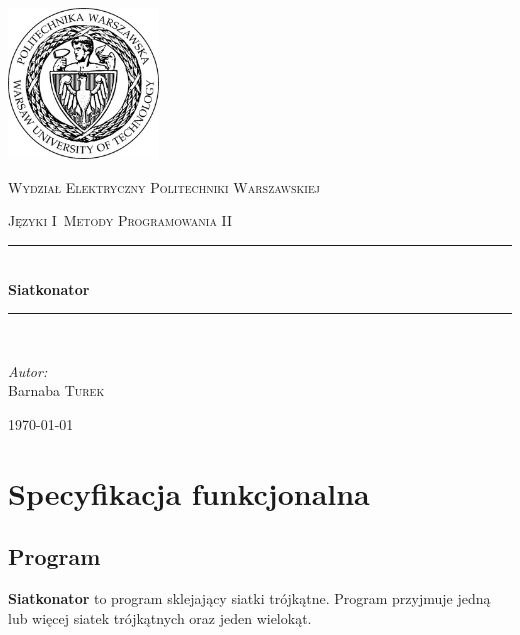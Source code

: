 \documentclass[a4paper]{article}
\newcommand{\HRule}{\rule{\linewidth}{0.5mm}}
\newcommand{\siatkonator}{\textbf{Siatkonator} }
\begin{document}
\begin{titlepage}

  \begin{center}


    \includegraphics[width=0.3\textwidth]{logo.jpg}\\[1cm]

    \begin{onehalfspace}
      \textsc{\LARGE Wydział Elektryczny Politechniki Warszawskiej}\\[1.5cm]
    \end{onehalfspace}



    \textsc{\Large Języki I~Metody Programowania II}\\[0.5cm]

    \HRule \\[0.4cm]
    {\huge \bfseries Siatkonator }\\[0.2cm]
    \HRule \\[1.5cm]

    \begin{flushleft} \large
      \emph{Autor:}\\
      Barnaba \textsc{Turek}
    \end{flushleft}
    \vfill

    {\large \today}

  \end{center}

\end{titlepage}
\sloppy

\setcounter{tocdepth}{4}
\tableofcontents

\section{Specyfikacja funkcjonalna}
\subsection{Program}
\siatkonator to program sklejający siatki trójkątne.
Program przyjmuje jedną lub więcej siatek trójkątnych oraz jeden wielokąt.
\end{document}
